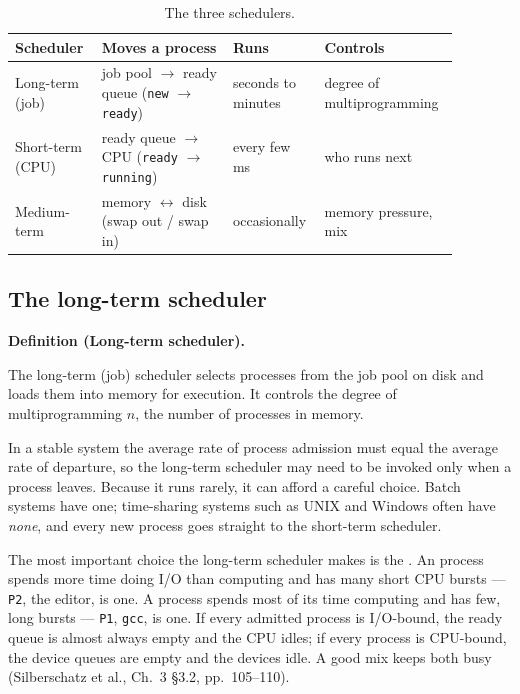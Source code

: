 \documentclass[11pt]{article}
\newenvironment{definitionbox}[1]{%
  \par\noindent\textbf{Definition (#1).}\ \itshape
}{\par\vspace{0.3em}}
\begin{document}
\begin{table}[h]
\centering
\small
\renewcommand{\arraystretch}{1.3}
\begin{tabular}{@{}>{\raggedright\arraybackslash}p{0.18\linewidth}>{\raggedright\arraybackslash}p{0.28\linewidth}>{\raggedright\arraybackslash}p{0.18\linewidth}>{\raggedright\arraybackslash}p{0.24\linewidth}@{}}
\toprule
\textbf{Scheduler} & \textbf{Moves a process} & \textbf{Runs} & \textbf{Controls} \\
\midrule
Long-term (job) & job pool $\to$ ready queue (\texttt{new} $\to$ \texttt{ready}) & seconds to minutes & degree of multiprogramming \\
Short-term (CPU) & ready queue $\to$ CPU (\texttt{ready} $\to$ \texttt{running}) & every few ms & who runs next \\
Medium-term & memory $\leftrightarrow$ disk (swap out / swap in) & occasionally & memory pressure, mix \\
\bottomrule
\end{tabular}
\caption{The three schedulers.}
\label{tab:schedulers}
\end{table}

\subsection{The long-term scheduler}

\begin{definitionbox}{Long-term scheduler}
The long-term (job) scheduler selects processes from the job pool on disk and
loads them into memory for execution. It controls the degree of
multiprogramming $n$, the number of processes in memory.
\end{definitionbox}

In a stable system the average rate of process admission must equal the
average rate of departure, so the long-term scheduler may need to be invoked
only when a process leaves. Because it runs rarely, it can afford a careful
choice. Batch systems have one; time-sharing systems such as UNIX and Windows
often have \emph{none}, and every new process goes straight to the short-term
scheduler.

The most important choice the long-term scheduler makes is the . An  process spends more time doing I/O than computing and
has many short CPU bursts --- \texttt{P2}, the editor, is one. A
 process spends most of its time computing and has few, long
bursts --- \texttt{P1}, \texttt{gcc}, is one. If every admitted process is
I/O-bound, the ready queue is almost always empty and the CPU idles; if every
process is CPU-bound, the device queues are empty and the devices idle. A good
mix keeps both busy (Silberschatz et al., Ch.~3 \S3.2, pp.~105--110).
\end{document}
